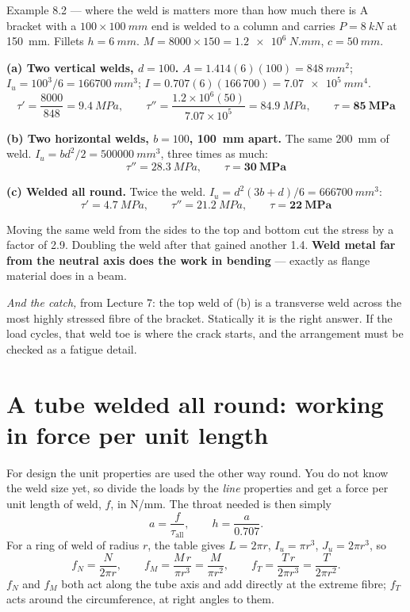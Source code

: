 \documentclass[11pt,a4paper]{article}
\begin{document}
\begin{examplebox}{Example 8.2 --- where the weld is matters more than how much there is}
A bracket with a $100\times\SI{100}{mm}$ end is welded to a column and carries $P=\SI{8}{kN}$ at
\SI{150}{mm}. Fillets $h=\SI{6}{mm}$. $M=8000\times150=\SI{1.2e6}{N.mm}$, $c=\SI{50}{mm}$.

\medskip
\textbf{(a) Two vertical welds, $d=100$.} $A=1.414(6)(100)=\SI{848}{mm^2}$;
$I_u=100^3/6=\SI{166700}{mm^3}$; $I=0.707(6)(166\,700)=\SI{7.07e5}{mm^4}$.
\[ \tau'=\frac{8000}{848}=\SI{9.4}{MPa},\qquad \tau''=\frac{1.2\times10^{6}(50)}{7.07\times10^{5}}=\SI{84.9}{MPa},\qquad \tau=\mathbf{\SI{85}{MPa}} \]

\textbf{(b) Two horizontal welds, $b=100$, \SI{100}{mm} apart.} The same \SI{200}{mm} of weld.
$I_u=bd^2/2=\SI{500000}{mm^3}$, three times as much:
\[ \tau''=\SI{28.3}{MPa},\qquad \tau=\mathbf{\SI{30}{MPa}} \]

\textbf{(c) Welded all round.} Twice the weld. $I_u=d^2(3b+d)/6=\SI{666700}{mm^3}$:
\[ \tau'=\SI{4.7}{MPa},\qquad \tau''=\SI{21.2}{MPa},\qquad \tau=\mathbf{\SI{22}{MPa}} \]

\medskip
Moving the same weld from the sides to the top and bottom cut the stress by a factor of 2.9.
Doubling the weld after that gained another 1.4. \textbf{Weld metal far from the neutral axis does
the work in bending} --- exactly as flange material does in a beam.

\medskip
\emph{And the catch,} from Lecture 7: the top weld of (b) is a transverse weld across the most
highly stressed fibre of the bracket. Statically it is the right answer. If the load cycles, that
weld toe is where the crack starts, and the arrangement must be checked as a fatigue detail.
\end{examplebox}

\section{A tube welded all round: working in force per unit length}
\label{sec:tube}

For design the unit properties are used the other way round. You do not know the weld size yet, so
divide the loads by the \emph{line} properties and get a force per unit length of weld, $f$, in
N/mm. The throat needed is then simply
\begin{equation}
a=\frac{f}{\tau_{\text{all}}},\qquad h=\frac{a}{0.707}.
\end{equation}
For a ring of weld of radius $r$, the table gives $L=2\pi r$, $I_u=\pi r^3$, $J_u=2\pi r^3$, so
\begin{equation}
f_N=\frac{N}{2\pi r},\qquad f_M=\frac{M\,r}{\pi r^3}=\frac{M}{\pi r^2},\qquad
f_T=\frac{T\,r}{2\pi r^3}=\frac{T}{2\pi r^2}.
\label{eq:ring}
\end{equation}
$f_N$ and $f_M$ both act along the tube axis and add directly at the extreme fibre; $f_T$ acts
around the circumference, at right angles to them.
\end{document}
